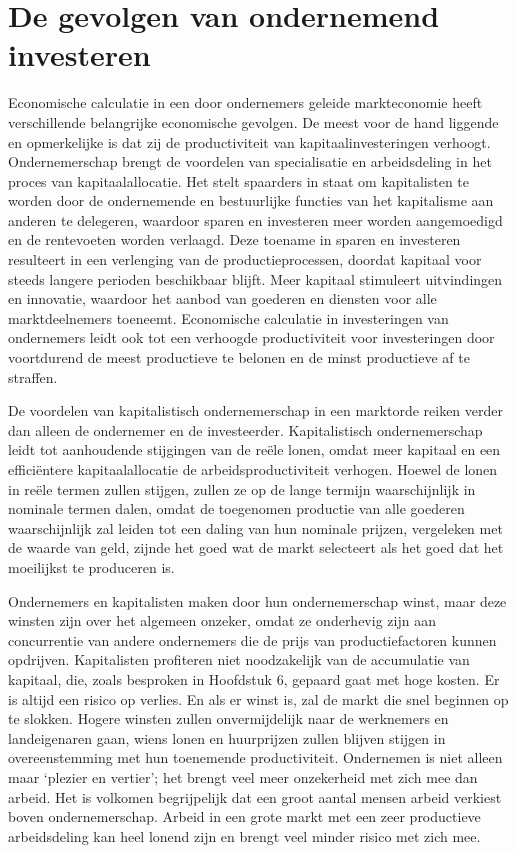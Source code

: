 \documentclass[
  a5paper,
  smalldemyvopaper,11pt,twoside,onecolumn,openright,extrafontsizes,
hidelinks]{memoir}
\begin{document}
\section{De gevolgen van ondernemend
investeren}\label{de-gevolgen-van-ondernemend-investeren}

Economische calculatie in een door ondernemers geleide markteconomie
heeft verschillende belangrijke economische gevolgen. De meest voor de
hand liggende en opmerkelijke is dat zij de productiviteit van
kapitaalinvesteringen verhoogt. Ondernemerschap brengt de voordelen van
specialisatie en arbeidsdeling in het proces van kapitaalallocatie. Het
stelt spaarders in staat om kapitalisten te worden door de ondernemende
en bestuurlijke functies van het kapitalisme aan anderen te delegeren,
waardoor sparen en investeren meer worden aangemoedigd en de rentevoeten
worden verlaagd. Deze toename in sparen en investeren resulteert in een
verlenging van de productieprocessen, doordat kapitaal voor steeds
langere perioden beschikbaar blijft. Meer kapitaal stimuleert
uitvindingen en innovatie, waardoor het aanbod van goederen en diensten
voor alle marktdeelnemers toeneemt. Economische calculatie in
investeringen van ondernemers leidt ook tot een verhoogde productiviteit
voor investeringen door voortdurend de meest productieve te belonen en
de minst productieve af te straffen.

De voordelen van kapitalistisch ondernemerschap in een marktorde reiken
verder dan alleen de ondernemer en de investeerder. Kapitalistisch
ondernemerschap leidt tot aanhoudende stijgingen van de reële lonen,
omdat meer kapitaal en een efficiëntere kapitaalallocatie de
arbeidsproductiviteit verhogen. Hoewel de lonen in reële termen zullen
stijgen, zullen ze op de lange termijn waarschijnlijk in nominale termen
dalen, omdat de toegenomen productie van alle goederen waarschijnlijk
zal leiden tot een daling van hun nominale prijzen, vergeleken met de
waarde van geld, zijnde het goed wat de markt selecteert als het goed
dat het moeilijkst te produceren is.

Ondernemers en kapitalisten maken door hun ondernemerschap winst, maar
deze winsten zijn over het algemeen onzeker, omdat ze onderhevig zijn
aan concurrentie van andere ondernemers die de prijs van
productiefactoren kunnen opdrijven. Kapitalisten profiteren niet
noodzakelijk van de accumulatie van kapitaal, die, zoals besproken in
Hoofdstuk 6, gepaard gaat met hoge kosten. Er is altijd een risico op
verlies. En als er winst is, zal de markt die snel beginnen op te
slokken. Hogere winsten zullen onvermijdelijk naar de werknemers en
landeigenaren gaan, wiens lonen en huurprijzen zullen blijven stijgen in
overeenstemming met hun toenemende productiviteit. Ondernemen is niet
alleen maar `plezier en vertier'; het brengt veel meer onzekerheid met
zich mee dan arbeid. Het is volkomen begrijpelijk dat een groot aantal
mensen arbeid verkiest boven ondernemerschap. Arbeid in een grote markt
met een zeer productieve arbeidsdeling kan heel lonend zijn en brengt
veel minder risico met zich mee.
\end{document}
